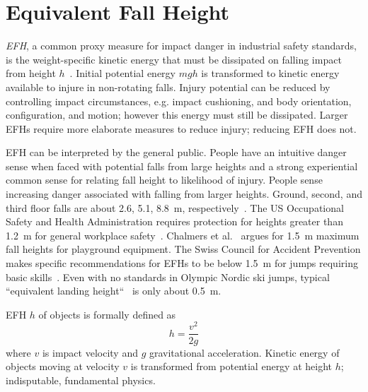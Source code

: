\documentclass[smallextended]{svjour3}       %
\begin{document}
\section{Equivalent Fall Height}
\label{sec:efh}
%
\emph{EFH}, a common proxy measure for impact danger in industrial safety
standards, is the weight-specific kinetic energy that must be dissipated on
falling impact from height $h$~\cite{Muller1995,Hubbard2009,Gasser2018}. Initial potential energy $mgh$ is
transformed to kinetic energy available to injure in non-rotating falls. Injury
potential can be reduced by controlling impact circumstances, e.g. impact
cushioning, and body orientation, configuration, and motion; however this
energy must still be dissipated. Larger EFHs require more elaborate measures to
reduce injury; reducing EFH does not.

EFH can be interpreted by the general public. People have an intuitive danger
sense when faced with potential falls from large heights and a strong
experiential common sense for relating fall height to likelihood of injury.
People sense increasing danger associated with falling from larger heights.
Ground, second, and third floor falls are about 2.6, 5.1, 8.8~\si{\meter},
respectively~\cite{Vish2005}. The US Occupational Safety and Health
Administration requires protection for heights greater than 1.2~\si{\meter} for
general workplace safety~\cite{OSHA2021}.  Chalmers et al.~\cite{Chalmers1996}
argues for 1.5~\si{\meter} maximum fall heights for playground equipment. The
Swiss Council for Accident Prevention makes specific recommendations for EFHs
to be below 1.5~\si{\meter} for jumps requiring basic skills~\cite{Heer2019}.
Even with no standards in Olympic Nordic ski jumps, typical ``equivalent
landing height``~\cite{Gasser2018} is only about 0.5~\si{\meter}.

EFH $h$ of objects is formally defined as
%
\begin{equation} h = \frac{v^2}{2g} \label{eq:efh_general} \end{equation}
%
where $v$ is impact velocity and $g$ gravitational acceleration.  Kinetic
energy of objects moving at  velocity $v$  is transformed from potential energy
at height $h$; indisputable, fundamental physics.
\end{document}
